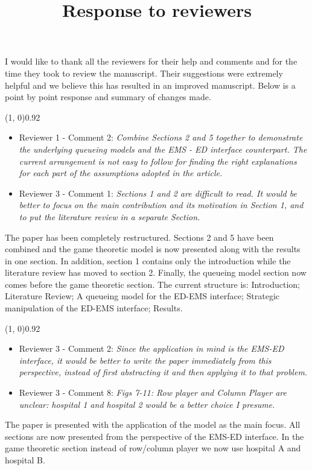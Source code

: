 \documentclass{article}
\title{Response to reviewers}
\author{}
\begin{document}
    \maketitle

    I would like to thank all the reviewers for their help and comments and for
    the time they took to review the manuscript.
    Their suggestions were extremely helpful and we believe this has resulted
    in an improved manuscript.
    Below is a point by point response and summary of changes made.


    \line(1, 0){0.92\textwidth}
    \begin{itemize}
        \item Reviewer 1 - Comment 2: \textit{Combine Sections 2 and 5
        together to demonstrate the underlying queueing models and the
        EMS - ED interface counterpart.
        The current arrangement is not easy to follow for finding the right
        explanations for each part of the assumptions adopted in the
        article.}

        \item Reviewer 3 - Comment 1: \textit{Sections 1 and 2 are
        difficult to read.
        It would be better to focus on the main contribution and its
        motivation in Section 1, and to put the literature review in a
        separate Section.}
    \end{itemize}
    The paper has been completely restructured.
    Sections 2 and 5 have been combined and the game theoretic model is now
    presented along with the results in one section.
    In addition, section 1 contains only the introduction while the
    literature review has moved to section 2.
    Finally, the queueing model section now comes before the game theoretic
    section.
    The current structure is: Introduction; Literature Review; A queueing
    model for the ED-EMS interface; Strategic manipulation of the ED-EMS
    interface; Results.

    \line(1, 0){0.92\textwidth}
    \begin{itemize}
        \item Reviewer 3 - Comment 2: \textit{Since the application in mind
        is the EMS-ED interface, it would be better to write the paper
        immediately from this perspective, instead of first abstracting it
        and then applying it to that problem.}
        \item Reviewer 3 - Comment 8: \textit{Figs 7-11: Row player and
        Column Player are unclear: hospital 1 and hospital 2 would be a
        better choice I presume.}
    \end{itemize}
    The paper is presented with the application of the model as the main focus.
    All sections are now presented from the perspective of the EMS-ED
    interface.
    In the game theoretic section instead of row/column player we now use
    hospital A and hospital B.
\end{document}

